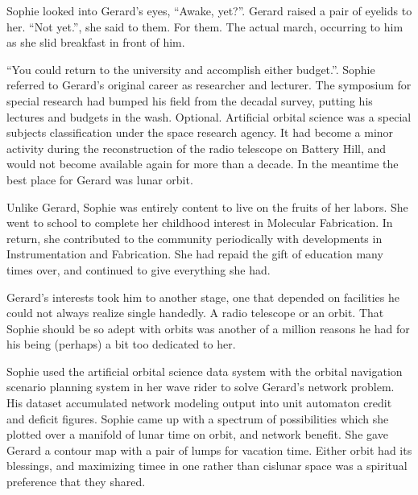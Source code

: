 Sophie looked into Gerard's eyes, ``Awake, yet?''.  Gerard raised a
pair of eyelids to her.  ``Not yet.'', she said to them.  For them.
The actual march, occurring to him as she slid breakfast in front of
him.



``You could return to the university and accomplish either budget.''.
Sophie referred to Gerard's original career as researcher and
lecturer.  The symposium for special research had bumped his field
from the decadal survey, putting his lectures and budgets in the wash.
Optional.  Artificial orbital science was a special subjects
classification under the space research agency.  It had become a minor
activity during the reconstruction of the radio telescope on Battery
Hill, and would not become available again for more than a decade.  In
the meantime the best place for Gerard was lunar orbit.



Unlike Gerard, Sophie was entirely content to live on the fruits of
her labors.  She went to school to complete her childhood interest in
Molecular Fabrication.  In return, she contributed to the community
periodically with developments in Instrumentation and Fabrication.
She had repaid the gift of education many times over, and continued to
give everything she had.

Gerard's interests took him to another stage, one that depended on
facilities he could not always realize single handedly.  A radio
telescope or an orbit.  That Sophie should be so adept with orbits was
another of a million reasons he had for his being (perhaps) a bit too
dedicated to her.



Sophie used the artificial orbital science data system with the
orbital navigation scenario planning system in her wave rider to solve
Gerard's network problem.  His dataset accumulated network modeling
output into unit automaton credit and deficit figures.  Sophie came up
with a spectrum of possibilities which she plotted over a manifold of
lunar time on orbit, and network benefit.  She gave Gerard a contour
map with a pair of lumps for vacation time.  Either orbit had its
blessings, and maximizing timee in one rather than cislunar space was
a spiritual preference that they shared.  



